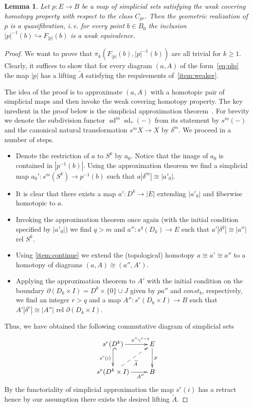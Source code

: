 \documentclass[oneside, 12pt]{amsart}
\theoremstyle{plain}
\numberwithin{equation}{section}
\newtheorem{lemma}{Lemma}
\numberwithin{lemma}{section}
\theoremstyle{remark}
\theoremstyle{definition}
\DeclareMathOperator{\sd}{sd}
\begin{document}
\begin{lemma} \label{lm:weak-equiv} Let $p\colon E \to B$ be a map of simplicial sets satisfying the weak covering homotopy property with respect to the class $C_{pr}$.
 Then the geometric realization of $p$ is a quasifibration, i.\,e. for every point $b \in B_0$ the inclusion $|p|^{-1}(b) \hookrightarrow F_{|p|}(b)$ is a weak equivalence. \end{lemma}
\begin{proof}

 We want to prove that $\pi_k(F_{|p|}(b), |p|^{-1}(b))$ are all trivial for $k \geq 1$.
 Clearly, it suffices to show that for every diagram $(a, A)$ of the form~\eqref{eq:plp} the map $|p|$ 
  has a lifting $\widetilde{A}$ satisfying the requirements of~\cref{item:weaker}.
 
 The idea of the proof is to approximate $(a, A)$ with a homotopic pair of simplicial maps and then invoke the weak covering homotopy property. 
 The key inredient in the proof below is the simplicial approximation theorem~\cite[Theorem~4.7]{Jar04}.
 For brevity we denote the subdivision functor $\sd^m\sd_*(-)$ from its statement by $s^m(-)$ and the canonical natural transformation $s^m X \to X$ by $\delta^m$.
 We proceed in a number of steps.
 \begin{itemize}
  \item Denote the restriction of $a$ to $S^k$ by $a_0$.
   Notice that the image of $a_0$ is contained in $|p^{-1}(b)|$.
   Using the approximation theorem we find a simplicial map $a_0'\colon s^m (S^k) \to p^{-1}(b)$ such that $a|\delta^m| \cong |a'_0|$.     
  \item It is clear that there exists a map $a'\colon D^k\to |E|$ extending $|a'_0|$ and fiberwise homotopic to $a$.
  \item Invoking the approximation theorem once again (with the initial condition specified by $|a'_0|$) we find $q>m$ and $a''\colon s^{q}(D_k) \to E$
    such that $a'|\delta^{q}| \cong |a''|$ rel $S^k$.
  \item Using \cref{item:continue} we extend the (topological) homotopy $a \cong a' \cong a''$ to a homotopy of diagrams $(a, A) \cong (a'', A')$.
  \item Applying the approximation theorem to $A'$ with the initial condition on the boundary $\partial (D_k \times I) = D^k\times \{0\} \cup J$ given by 
    $pa''$ and $const_b$, respectively, we find an integer $r>q$ and a map $A''\colon s^{r}(D_k \times I) \to B$ such that
    $A'|\delta^r|\cong |A''|$ rel $\partial (D_k \times I)$.
 \end{itemize}
 Thus, we have obtained the following commutative diagram of simplicial sets
   \begin{equation} \nonumber \xymatrix{ 
    s^{r}(D^k)          \ar[r]^(0.7){a''\gamma^{r-q}}  \ar@{^{(}->}_{s^{r}(i)}[d] & E \ar[d]^{p}  \\
    s^{r}(D^k \times I) \ar[r]_(0.7){A''}  \ar@{-->}[ru]_{\widetilde{A}} & B}
   \end{equation}
 By the functoriality of simplicial approximation the map $s^{r}(i)$ has a retract hence
  by our assumption there exists the desired lifting $\widetilde{A}$.
 \end{proof}
 

\printbibliography
\end{document}
